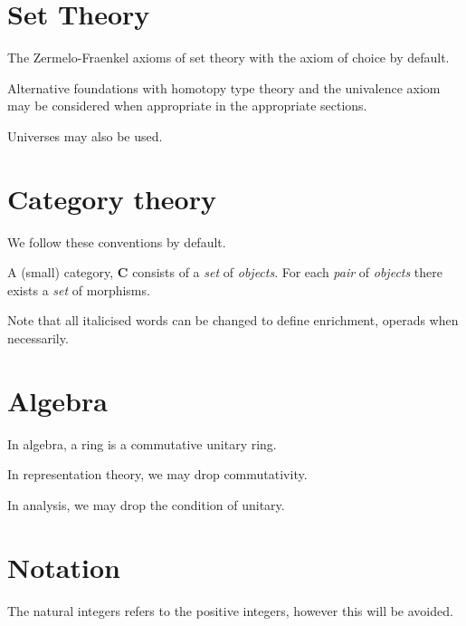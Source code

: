 \section{Set Theory}
\label{section-set-theory}

The Zermelo-Fraenkel axioms of set theory with the axiom of choice by default. 

Alternative foundations with homotopy type theory and the univalence axiom may be considered when appropriate in the appropriate sections.

Universes may also be used.

\section{Category theory}
\label{section-category-theory}

We follow these conventions \cite{Stacks} by default.  

\begin{definition}
	A (small) category, $\mathbf{C}$ consists of a \textit{set} of \textit{objects}. For each \textit{pair} of \textit{objects} there exists a \textit{set} of morphisms.
\end{definition}

Note that all italicised words can be changed to define enrichment, operads when necessarily.

\section{Algebra}
\label{section-algebra}

In algebra, a ring is a commutative unitary ring.

In representation theory, we may drop commutativity.

In analysis, we may drop the condition of unitary.

\section{Notation}

The natural integers refers to the positive integers, however this will be avoided.